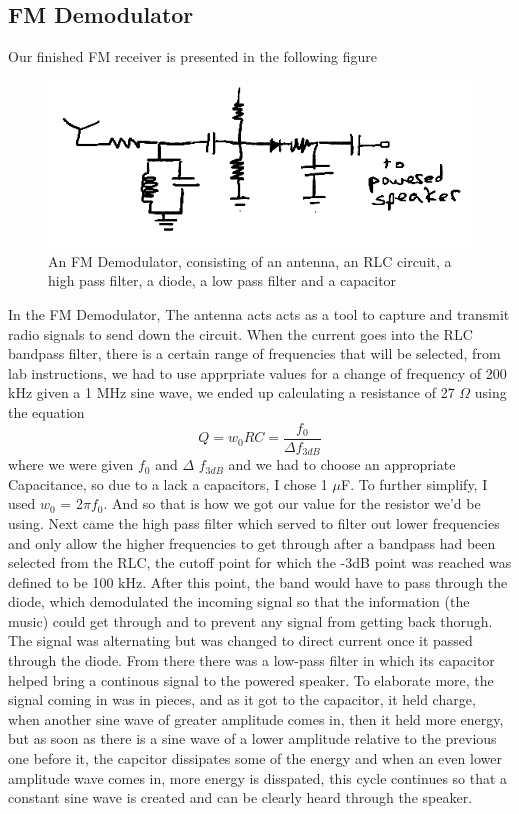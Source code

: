 \documentclass[12 pt]{article}
\begin{document}
\subsection{FM Demodulator}
Our finished FM receiver is presented in the following figure
\begin{figure}[H]
\center
\includegraphics[scale=.5]{fm_demodulation.png}
\caption{An FM Demodulator, consisting of an antenna, an RLC circuit, a high pass
  filter, a diode, a low pass filter and a capacitor}
\label{FM Demodulator}
\end{figure}
In the FM Demodulator, The antenna acts acts as a tool to capture and
transmit radio signals to send down the circuit. When the current goes
into the RLC bandpass filter, there is a certain range of frequencies
that will be selected, from lab instructions, we had to use apprpriate
values for a change of frequency of 200 kHz given a 1 MHz sine wave, we
ended up calculating a resistance of 27 $\Omega$ using the equation
\begin{equation}
  \label{resistance for RLC}
  Q = w_{0}RC = \frac{f_{0}}{\Delta f_{3dB}}
\end{equation}
where we were given $f_0$ and $\Delta$ $f_{3dB}$ and we had to choose an
appropriate Capacitance, so due to a lack a capacitors, I chose 1
$\mu$F. To further simplify, I used $w_{0}$ = 2$\pi$$f_{0}$. And so that
is how we got our value for the resistor we'd be using. Next came the
high pass filter which served to filter out lower frequencies and only
allow the higher frequencies to get through after a bandpass had been
selected from the RLC, the cutoff point for which the -3dB point was
reached was defined to be 100 kHz. After this point, the band would have
to pass through the diode, which demodulated the incoming signal so that
the information (the music) could get through and to prevent any signal
from getting back thorugh. The signal was alternating but was changed to
direct current once it passed through the diode. From there there was a
low-pass filter in which its capacitor helped bring a continous signal
to the powered speaker. To elaborate more, the signal coming in was in
pieces, and as it got to the capacitor, it held charge, when another
sine wave of greater amplitude comes in,  then it held more energy, but
as soon as there is a sine wave of a lower amplitude relative to the
previous one before it,  the capcitor dissipates some of the energy and
when an even lower amplitude wave comes in, more energy is disspated,
this cycle continues so that a constant sine wave is created and can be
clearly heard through the speaker.
\end{document}
